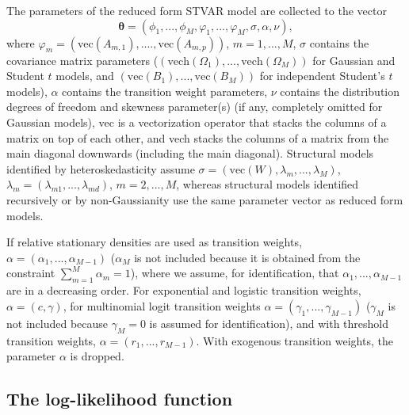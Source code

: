 \documentclass[nojss]{jss}
\begin{document}
The parameters of the reduced form STVAR model are collected to the vector
\begin{equation}\label{eq:paramvector}
\boldsymbol{\theta}=(\phi_{1},...,\phi_M,\varphi_1,...,\varphi_M,\sigma,\alpha,\nu),
\end{equation}
where $\varphi_m=(\text{vec}(A_{m,1}),....,\text{vec}(A_{m,p}))$, $m=1,...,M$, $\sigma$ contains the covariance matrix parameters ($(\text{vech}(\Omega_1),...,\text{vech}(\Omega_M))$ for Gaussian and Student $t$ models, and $(\text{vec}(B_1),...,\text{vec}(B_M))$ for independent Student's $t$ models), $\alpha$ contains the transition weight parameters, $\nu$ contains the distribution degrees of freedom and skewness parameter(s) (if any, completely omitted for Gaussian models), vec is a vectorization operator that stacks the columns of a matrix on top of each other, and vech stacks the columns of a matrix from the main diagonal downwards (including the main diagonal). Structural models identified by heteroskedasticity assume $\sigma = (\text{vec}(W),\lambda_m,...,\lambda_M)$, $\lambda_m=(\lambda_{m1},...,\lambda_{md})$, $m=2,...,M$, whereas structural models identified recursively or by non-Gaussianity use the same parameter vector as reduced form models.

If relative stationary densities are used as transition weights, $\alpha=(\alpha_1,...,\alpha_{M-1})$ ($\alpha_M$ is not included because it is obtained from the constraint $\sum_{m=1}^M \alpha_m=1$), where we assume, for identification, that $\alpha_1,...,\alpha_{M-1}$ are in a decreasing order. For exponential and logistic transition weights, $\alpha=(c,\gamma)$, for multinomial logit transition weights  $\alpha=(\gamma_1,...,\gamma_{M-1})$ ($\gamma_M$ is not included because $\gamma_M=0$ is assumed for identification), and with threshold transition weights, $\alpha=(r_1,...,r_{M-1})$. With exogenous transition weights, the parameter $\alpha$ is dropped.

\subsection{The log-likelihood function}\label{sec:loglik}
\end{document}
